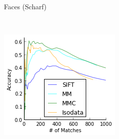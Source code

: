 \documentclass[12pt,journal,compsoc]{IEEEtran}
\begin{document}
\begin{figure}
{\begin{subfigure}[t]{.15\textwidth}
			\caption{Faces (Scharf)}
			\label{fig:result_faces}
		\end{subfigure}%
		~ %
		\begin{subfigure}[t]{.27\textwidth}
			\centering
			\includegraphics[width=\textwidth]{images/result_scharf}
		\end{subfigure}%
	}%


\end{figure}
\end{document}
